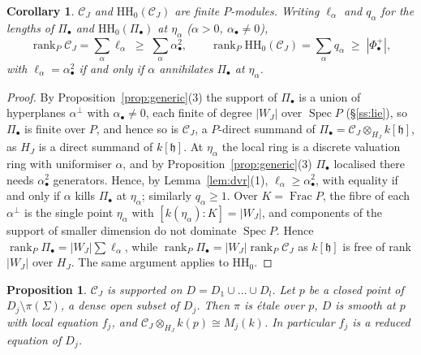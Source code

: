 \documentclass[11pt]{amsart}
\numberwithin{table}{section}
\numberwithin{figure}{section}
\numberwithin{equation}{section}
\newtheorem{prop}[thm]{Proposition}
\newtheorem{cor}[thm]{Corollary}
\theoremstyle{definition}
\theoremstyle{plain}
\newcommand{\cC}{\mathcal{C}}
\newcommand{\h}{\mathfrak{h}}
\newcommand{\bul}{\bullet}
\newcommand{\HH}{\mathrm{HH}}
\DeclareMathOperator{\Spec}{Spec}
\DeclareMathOperator{\rank}{rank}
\DeclareMathOperator{\Frac}{Frac}
\begin{document}
\begin{cor}\label{cor:lower}
$\cC_J$ and $\HH_0(\cC_J)$ are finite $P$-modules. Writing $\ell_\alpha$ and $q_\alpha$ for the lengths of $\Pi_\bul$ and $\HH_0(\Pi_\bul)$ at $\eta_\alpha$ ($\alpha > 0$, $\alpha_\bul \neq 0$),
\[
\rank_P \cC_J = \sum_{\alpha} \ell_\alpha \;\ge\; \sum_{\alpha} \alpha_\bul^2, \qquad \rank_P \HH_0(\cC_J) = \sum_{\alpha} q_\alpha \;\ge\; |\Phi^+_\bul|,
\]
with $\ell_\alpha = \alpha_\bul^2$ if and only if $\alpha$ annihilates $\Pi_\bul$ at $\eta_\alpha$.
\end{cor}

\begin{proof}
By Proposition~\ref{prop:generic}(3) the support of $\Pi_\bul$ is a union of hyperplanes $\alpha^\perp$ with $\alpha_\bul \neq 0$, each finite of degree $|W_J|$ over $\Spec P$ (\S\ref{ss:lie}), so $\Pi_\bul$ is finite over $P$, and hence so is $\cC_J$, a $P$-direct summand of $\Pi_\bul = \cC_J \otimes_{H_J} k[\h]$, as $H_J$ is a direct summand of $k[\h]$. At $\eta_\alpha$ the local ring is a discrete valuation ring with uniformiser $\alpha$, and by Proposition~\ref{prop:generic}(3) $\Pi_\bul$ localised there needs $\alpha_\bul^2$ generators. Hence, by Lemma~\ref{lem:dvr}(1), $\ell_\alpha \ge \alpha_\bul^2$, with equality if and only if $\alpha$ kills $\Pi_\bul$ at $\eta_\alpha$; similarly $q_\alpha \ge 1$. Over $K = \Frac P$, the fibre of each $\alpha^\perp$ is the single point $\eta_\alpha$ with $[k(\eta_\alpha) : K] = |W_J|$, and components of the support of smaller dimension do not dominate $\Spec P$. Hence $\rank_P \Pi_\bul = |W_J| \sum \ell_\alpha$, while $\rank_P \Pi_\bul = |W_J| \rank_P \cC_J$ as $k[\h]$ is free of rank $|W_J|$ over $H_J$. The same argument applies to $\HH_0$.
\end{proof}

\begin{prop}\label{prop:support}
$\cC_J$ is supported on $D = D_1 \cup \dots \cup D_l$. Let $p$ be a closed point of $D_j \setminus \pi(\Sigma)$, a dense open subset of $D_j$. Then $\pi$ is \'etale over $p$, $D$ is smooth at $p$ with local equation $f_j$, and $\cC_J \otimes_{H_J} k(p) \cong M_j(k)$. In particular $f_j$ is a reduced equation of $D_j$.
\end{prop}
\end{document}
